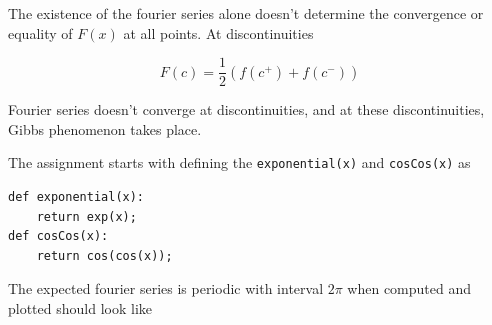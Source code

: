 \documentclass[12pt, a4paper]{report}
\begin{document}
The existence of the fourier series alone doesn't determine the convergence or equality of $F(x)$ at all points.
At discontinuities

\begin{equation*}
F(c)=\frac{1}{2}(f(c^+)+f(c^-))
\end{equation*}

Fourier series doesn't converge at discontinuities, and at these discontinuities, Gibbs phenomenon takes place.

The assignment starts with defining the \texttt{exponential(x)} and \texttt{cosCos(x)} as

\begin{verbatim}
def exponential(x):
    return exp(x);
def cosCos(x):
    return cos(cos(x));
\end{verbatim} 

The expected fourier series is periodic with interval $2\pi$ when computed and plotted should look like
\end{document}
